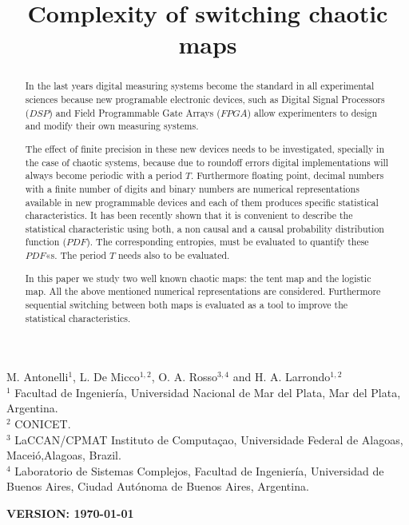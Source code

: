 \begin{frontmatter}

	\title{Complexity of switching chaotic maps}
	M. Antonelli$^{1}$, L. De Micco$^{1,2}$, O. A. Rosso$^{3,4}$ and H. A. Larrondo$^{1,2}$\\
	$^{1}$ Facultad de Ingenier\'ia, Universidad Nacional de Mar del Plata, Mar del Plata, Argentina.\\
	$^{2}$ CONICET.\\
	$^{3}$ LaCCAN/CPMAT Instituto de Computa\c{c}ao, Universidade Federal de Alagoas, Macei\'o,Alagoas, Brazil.\\
	$^{4}$ Laboratorio de Sistemas Complejos, Facultad de
	Ingenier\'ia, Universidad de Buenos Aires, Ciudad Aut\'onoma de
	Buenos Aires, Argentina.\\

\begin{abstract} 
In the last years digital measuring systems become the standard in
all experimental sciences because new programable electronic
devices, such as Digital Signal Processors ($DSP$) and Field
Programmable Gate Arrays ($FPGA$) allow experimenters to design and
modify their own measuring systems.

The effect of finite precision in these new devices needs to be
investigated, specially in the case of chaotic systems, because due to roundoff errors digital implementations will always become periodic with a period $T$. Furthermore floating point, decimal numbers with a finite number of digits and binary numbers are numerical representations available in new programmable devices and each of them produces specific statistical characteristics. It has been recently shown that it is convenient to describe the statistical characteristic using both, a non causal and a causal probability distribution function ($PDF$). The corresponding entropies, must be evaluated to quantify these $PDF$«s. The period $T$ needs  also to be evaluated. 

In this paper we study  two well
known chaotic maps: the tent map and the logistic map. All the above mentioned numerical representations are considered. Furthermore sequential switching between both maps is evaluated as a tool to improve the statistical characteristics. 

\end{abstract}
\maketitle
\end{frontmatter}
{\bf VERSION: \today}